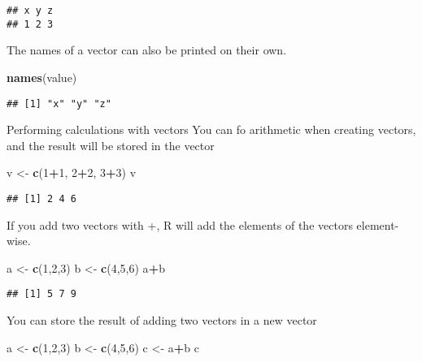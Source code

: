 \documentclass[
]{article}
\newenvironment{Shaded}{\begin{snugshade}}{\end{snugshade}}
\newcommand{\DecValTok}[1]{\textcolor[rgb]{0.00,0.00,0.81}{#1}}
\newcommand{\KeywordTok}[1]{\textcolor[rgb]{0.13,0.29,0.53}{\textbf{#1}}}
\newcommand{\NormalTok}[1]{#1}
\newcommand{\OperatorTok}[1]{\textcolor[rgb]{0.81,0.36,0.00}{\textbf{#1}}}
\newcommand{\StringTok}[1]{\textcolor[rgb]{0.31,0.60,0.02}{#1}}
\begin{document}
\begin{verbatim}
## x y z 
## 1 2 3
\end{verbatim}

The names of a vector can also be printed on their own.

\begin{Shaded}
\begin{Highlighting}[]
 \KeywordTok{names}\NormalTok{(value)}
\end{Highlighting}
\end{Shaded}

\begin{verbatim}
## [1] "x" "y" "z"
\end{verbatim}

Performing calculations with vectors You can fo arithmetic when creating
vectors, and the result will be stored in the vector

\begin{Shaded}
\begin{Highlighting}[]
\NormalTok{  v <-}\StringTok{ }\KeywordTok{c}\NormalTok{(}\DecValTok{1}\OperatorTok{+}\DecValTok{1}\NormalTok{, }\DecValTok{2}\OperatorTok{+}\DecValTok{2}\NormalTok{, }\DecValTok{3}\OperatorTok{+}\DecValTok{3}\NormalTok{)}
\NormalTok{  v}
\end{Highlighting}
\end{Shaded}

\begin{verbatim}
## [1] 2 4 6
\end{verbatim}

If you add two vectors with +, R will add the elements of the vectors
element-wise.

\begin{Shaded}
\begin{Highlighting}[]
\NormalTok{  a <-}\StringTok{ }\KeywordTok{c}\NormalTok{(}\DecValTok{1}\NormalTok{,}\DecValTok{2}\NormalTok{,}\DecValTok{3}\NormalTok{)}
\NormalTok{  b <-}\StringTok{ }\KeywordTok{c}\NormalTok{(}\DecValTok{4}\NormalTok{,}\DecValTok{5}\NormalTok{,}\DecValTok{6}\NormalTok{)}
\NormalTok{  a}\OperatorTok{+}\NormalTok{b}
\end{Highlighting}
\end{Shaded}

\begin{verbatim}
## [1] 5 7 9
\end{verbatim}

You can store the result of adding two vectors in a new vector

\begin{Shaded}
\begin{Highlighting}[]
\NormalTok{  a <-}\StringTok{ }\KeywordTok{c}\NormalTok{(}\DecValTok{1}\NormalTok{,}\DecValTok{2}\NormalTok{,}\DecValTok{3}\NormalTok{)}
\NormalTok{  b <-}\StringTok{ }\KeywordTok{c}\NormalTok{(}\DecValTok{4}\NormalTok{,}\DecValTok{5}\NormalTok{,}\DecValTok{6}\NormalTok{)}
\NormalTok{  c <-}\StringTok{ }\NormalTok{a}\OperatorTok{+}\NormalTok{b}
\NormalTok{  c}
\end{Highlighting}
\end{Shaded}
\end{document}
